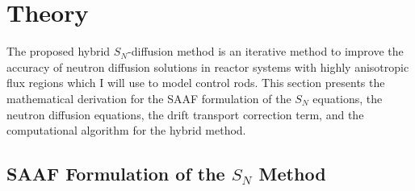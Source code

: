 \section{Theory} \label{sec:theory}

The proposed hybrid $S_N$-diffusion method is an iterative method to improve the
accuracy of neutron diffusion solutions in reactor systems with highly anisotropic flux regions
which I will use to model control rods. This section presents the mathematical derivation for the
\gls{SAAF} formulation of the $S_N$ equations, the neutron diffusion equations, the drift
transport correction term, and the computational algorithm for the hybrid method.

\subsection{\gls{SAAF} Formulation of the $S_N$ Method} 

